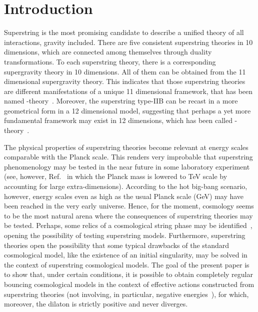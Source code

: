 \documentclass[a4paper,aps,twocolumn,prd,showpacs,nofootinbib]{revtex4}
\providecommand{\mP}{M_{_{\rm Pl}}}
\begin{document}
\section{Introduction}

Superstring is the most promising candidate to describe a unified
theory of all interactions, gravity included. There are five
consistent superstring theories in 10 dimensions, which are connected
among themselves through duality transformations. To each superstring
theory, there is a corresponding supergravity theory in 10
dimensions. All of them can be obtained from the 11 dimensional
supergravity theory. This indicates that those superstring theories
are different manifestations of a unique 11 dimensional framework,
that has been named
\coordHE{}-theory~\cite{polchinski,green,kiritsis}. Moreover, the superstring
type-IIB can be recast in a more geometrical form in a 12 dimensional
model, suggesting that perhaps a yet more fundamental framework may
exist in 12 dimensions, which has been called \coordHE{}-theory~\cite{pope}.

The physical properties of superstring theories become relevant at
energy scales comparable with the Planck scale. This renders very
improbable that superstring phenomenology may be tested in the near
future in some laboratory experiment (see, however, Ref.~\cite{randal}
in which the Planck mass is lowered to TeV scale by accounting for
large extra-dimensions). According to the hot big-bang scenario,
however, energy scales even as high as the usual Planck scale
(\myHighlight{$\mP\sim 10^{19}$}\coordHE{}GeV) may have been reached in the very early
universe. Hence, for the moment, cosmology seems to be the most
natural arena where the consequences of superstring theories may be
tested. Perhaps, some relics of a cosmological string phase may be
identified~\cite{bdp}, opening the possibility of testing superstring
models. Furthermore, superstring theories open the possibility that
some typical drawbacks of the standard cosmological model, like the
existence of an initial singularity, may be solved in the context of
superstring cosmological models.  The goal of the present paper is to
show that, under certain conditions, it is possible to obtain
completely regular bouncing cosmological models in the context of
effective actions constructed from superstring theories (not
involving, in particular, negative energies~\cite{ppnpn2}), for which,
moreover, the dilaton is strictly positive and never diverges.
\end{document}
